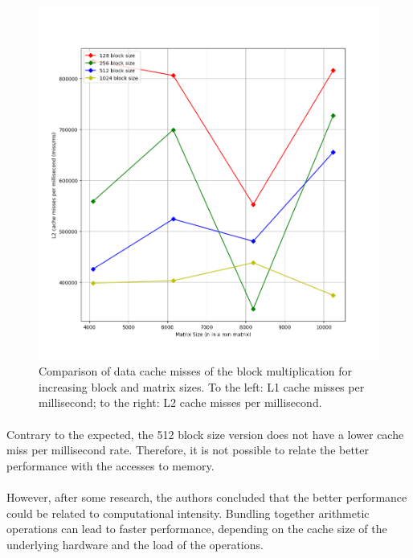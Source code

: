 \documentclass{report}
\begin{document}
\begin{figure}[H]
\begin{adjustbox}{center}
						\includegraphics[scale=0.4]{cpp_block_l2_misses.png}
					\end{adjustbox}
					\caption{Comparison of data cache misses of the block multiplication for increasing block and matrix sizes. To the left: L1 cache misses per millisecond; to the right: L2 cache misses per millisecond.}
				\end{figure}
			
				\paragraph{}Contrary to the expected, the 512 block size version does not have a lower cache miss per millisecond rate. Therefore, it is not possible to relate the better performance with the accesses to memory.
				
				\paragraph{}However, after some research, the authors concluded that the better performance could be related to computational intensity. Bundling together arithmetic operations can lead to faster performance, depending on the cache size of the underlying hardware and the load of the operations. \cite{1}
		
\end{document}
